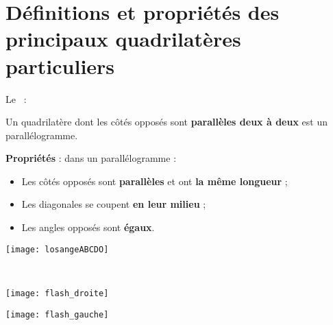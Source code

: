 \section{Définitions et propriétés des principaux quadrilatères particuliers}

\begin{definition}
Le  :

Un quadrilatère dont les côtés opposés sont \textcolor{C2}{\textbf{parallèles deux à deux}} est un parallélogramme. \\[-5em]
\begin{minipage}[t]{0.76\linewidth}
\textcolor{H1}{\textbf{Propriétés}} : dans un parallélogramme :
\begin{itemize}
 \item Les côtés opposés sont \textcolor{H1}{\textbf{parallèles}} et ont \textcolor{H1}{\textbf{la même longueur}} ;
 \item Les diagonales se coupent \textcolor{H1}{\textbf{en leur milieu}} ;
 \item Les angles opposés sont \textcolor{H1}{\textbf{égaux}}.
 \end{itemize}
 \end{minipage}
 \begin{minipage}[c]{0.18\linewidth}
 \vspace{1cm}
  \texttt{[image: losangeABCDO]}
  \end{minipage} \\
\end{definition}

\begin{minipage}[t]{0.49\linewidth}
\begin{center} \texttt{[image: flash\_droite]} \end{center}
 \end{minipage}
 \begin{minipage}[t]{0.49\linewidth}
\begin{center} \texttt{[image: flash\_gauche]} \end{center}
 \end{minipage} \\[-2em]

